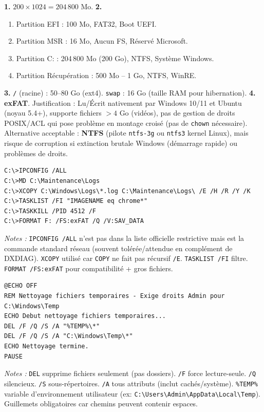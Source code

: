 \documentclass[11pt]{article}
\begin{document}
\begin{corrige}[Exercice 1]
\textbf{1.} $200 \times 1024 = 204\,800$ Mo.
\textbf{2.}
\begin{enumerate}
  \item Partition EFI : 100 Mo, FAT32, Boot UEFI.
  \item Partition MSR : 16 Mo, Aucun FS, Réservé Microsoft.
  \item Partition C: : 204\,800 Mo (200 Go), NTFS, Système Windows.
  \item Partition Récupération : 500 Mo -- 1 Go, NTFS, WinRE.
\end{enumerate}
\textbf{3.} \texttt{/} (racine) : 50--80 Go (ext4). \texttt{swap} : 16 Go (taille RAM pour hibernation).
\textbf{4.} \textbf{exFAT}. Justification : Lu/Écrit nativement par Windows 10/11 et Ubuntu (noyau 5.4+), supporte fichiers $> 4$ Go (vidéos), pas de gestion de droits POSIX/ACL qui pose problème en montage croisé (pas de \texttt{chown} nécessaire). Alternative acceptable : \textbf{NTFS} (pilote \texttt{ntfs-3g} ou \texttt{ntfs3} kernel Linux), mais risque de corruption si extinction brutale Windows (démarrage rapide) ou problèmes de droits.
\end{corrige}

\begin{corrige}[Exercice 2]
\begin{lstlisting}
C:\>IPCONFIG /ALL
C:\>MD C:\Maintenance\Logs
C:\>XCOPY C:\Windows\Logs\*.log C:\Maintenance\Logs\ /E /H /R /Y /K
C:\>TASKLIST /FI "IMAGENAME eq chrome*"
C:\>TASKKILL /PID 4512 /F
C:\>FORMAT F: /FS:exFAT /Q /V:SAV_DATA
\end{lstlisting}
\textit{Notes :} \texttt{IPCONFIG /ALL} n'est pas dans la liste officielle restrictive mais est la commande standard réseau (souvent tolérée/attendue en complément de DXDIAG). \texttt{XCOPY} utilisé car \texttt{COPY} ne fait pas récursif \texttt{/E}. \texttt{TASKLIST /FI} filtre. \texttt{FORMAT /FS:exFAT} pour compatibilité + gros fichiers.
\end{corrige}

\begin{corrige}[Exercice 3]
\begin{lstlisting}
@ECHO OFF
REM Nettoyage fichiers temporaires - Exige droits Admin pour C:\Windows\Temp
ECHO Debut nettoyage fichiers temporaires...
DEL /F /Q /S /A "%TEMP%\*"
DEL /F /Q /S /A "C:\Windows\Temp\*"
ECHO Nettoyage termine.
PAUSE
\end{lstlisting}
\textit{Notes :} \texttt{DEL} supprime fichiers seulement (pas dossiers). \texttt{/F} force lecture-seule. \texttt{/Q} silencieux. \texttt{/S} sous-répertoires. \texttt{/A} tous attributs (inclut cachés/système). \texttt{\%TEMP\%} variable d'environnement utilisateur (ex: \texttt{C:\textbackslash Users\textbackslash Admin\textbackslash AppData\textbackslash Local\textbackslash Temp}). Guillemets obligatoires car chemins peuvent contenir espaces.
\end{corrige}
\end{document}
